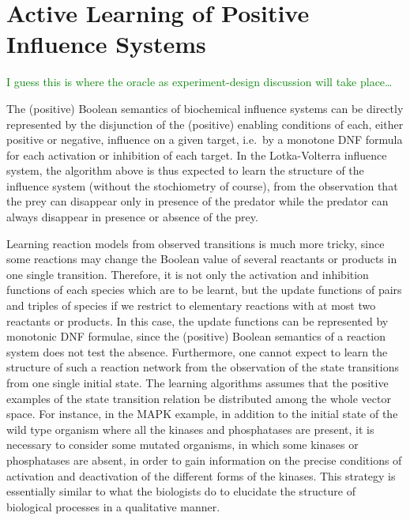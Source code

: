 \documentclass{llncs}
\newcommand{\sylvain}[1]{\textcolor{green}{#1}}
\begin{document}
\section{Active Learning of Positive Influence Systems}
\label{sec:oracles}

\sylvain{I guess this is where the oracle as experiment-design discussion will
take place\dots}

The (positive) Boolean semantics of biochemical influence systems
can be directly represented by the disjunction of the (positive) enabling conditions of each, either positive or negative, influence on a given target,
i.e.~by a monotone DNF formula for each activation or inhibition of each target.
In the Lotka-Volterra influence system, the algorithm above is thus expected to learn the structure of the influence system
(without the stochiometry of course),
from the observation that the prey can disappear only in presence of the predator
while the predator can always disappear in presence or absence of the prey.

  Learning reaction models from observed transitions is much more tricky,
  since some reactions may change the Boolean value of several reactants or products in one single transition.
  Therefore, it is not only the activation and inhibition functions of each species which are to be learnt,
  but the update functions of pairs and triples of species if we restrict to elementary reactions with at most two reactants or products.
  In this case, the update functions can be represented by monotonic DNF formulae, since the (positive) Boolean semantics of a reaction system does not test the absence.
Furthermore,   one cannot expect to learn the structure of such a reaction network
from the observation of the state transitions from one single initial state.
The learning algorithms assumes that the positive examples of the state transition relation be distributed
among the whole vector space.
For instance, in the MAPK example, in addition to the initial state of the wild type organism where all the kinases and phosphatases are present,
it is necessary to consider some mutated organisms, in which some kinases or phosphatases are absent,
in order to gain information on the precise conditions of activation and deactivation of the different forms of the kinases.
This strategy is essentially similar to what the biologists do to elucidate the structure of biological processes
in a qualitative manner.
\end{document}
